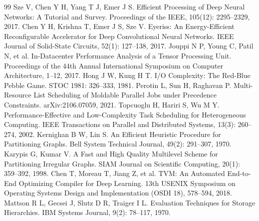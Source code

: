 \begin{thebibliography}{99}
 Sze V, Chen Y H, Yang T J, Emer J S. Efficient Processing of Deep Neural Networks: A Tutorial and Survey. Proceedings of the IEEE, 105(12): 2295--2329, 2017.
 Chen Y H, Krishna T, Emer J S, Sze V. Eyeriss: An Energy-Efficient Reconfigurable Accelerator for Deep Convolutional Neural Networks. IEEE Journal of Solid-State Circuits, 52(1): 127--138, 2017.
 Jouppi N P, Young C, Patil N, et al. In-Datacenter Performance Analysis of a Tensor Processing Unit. Proceedings of the 44th Annual International Symposium on Computer Architecture, 1--12, 2017.
 Hong J W, Kung H T. I/O Complexity: The Red-Blue Pebble Game. STOC 1981: 326--333, 1981.
 Perotin L, Sun H, Raghavan P. Multi-Resource List Scheduling of Moldable Parallel Jobs under Precedence Constraints. arXiv:2106.07059, 2021.
 Topcuoglu H, Hariri S, Wu M Y. Performance-Effective and Low-Complexity Task Scheduling for Heterogeneous Computing. IEEE Transactions on Parallel and Distributed Systems, 13(3): 260--274, 2002.
 Kernighan B W, Lin S. An Efficient Heuristic Procedure for Partitioning Graphs. Bell System Technical Journal, 49(2): 291--307, 1970.
 Karypis G, Kumar V. A Fast and High Quality Multilevel Scheme for Partitioning Irregular Graphs. SIAM Journal on Scientific Computing, 20(1): 359--392, 1998.
 Chen T, Moreau T, Jiang Z, et al. TVM: An Automated End-to-End Optimizing Compiler for Deep Learning. 13th USENIX Symposium on Operating Systems Design and Implementation (OSDI 18), 578--594, 2018.
 Mattson R L, Gecsei J, Slutz D R, Traiger I L. Evaluation Techniques for Storage Hierarchies. IBM Systems Journal, 9(2): 78--117, 1970.
\end{thebibliography}

